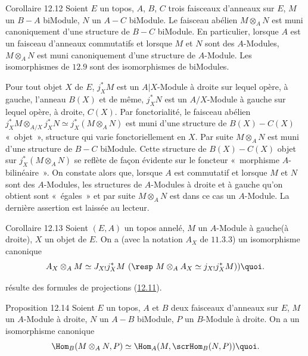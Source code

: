 \begin{enonce*}{Corollaire 12.12}
Soient $E$ un topos, $A$, $B$, $C$ trois faisceaux d'anneaux sur
$E$, $M$ un $B-A$ biModule, $N$ un $A-C$ biModule. Le faisceau
abélien $M\otimes_A N$ est muni canoniquement d'une structure de
$B-C$ biModule. En particulier, lorsque $A$ est un faisceau
d'anneaux commutatifs et lorsque $M$ et $N$ sont des $A$-Modules,
$M\otimes_AN$ est muni canoniquement d'une structure de $A$-Module.
Les isomorphismes de $\hyperref[IV.subsec12.9]{12.9}$ sont des isomorphismes de
biModules.
\end{enonce*}

Pour tout objet $X$ de $E$, $j^{\ast}_XM$ est un $A| X$-Module à
droite sur lequel opère, à gauche, l'anneau $B(X)$ et de même,
$j^{\ast}_XN$ est un $A/X$-Module à gauche sur lequel opère, à
droite, $C(X)$. Par fonctorialité, le faisceau abélien
$j^{\ast}_XM\otimes_{A/X} j^{\ast}_XN\simeq j^{\ast}_X (M\otimes_A
N)$ est muni d'une structure de $B(X)-C(X)$ « objet », structure
qui varie fonctoriellement en $X$. Par suite $M\otimes_A N$ est muni
d'une structure de $B-C$ biModule. Cette structure de $B(X)-C(X)$
objet sur $j^{\ast}_X(M\otimes_A N)$ se reflète de façon évidente
sur le foncteur « morphisme $A$-bilinéaire ». On constate alors
que, lorsque $A$ est commutatif et lorsque $M$ et $N$ sont des
$A$-Modules, les structures de $A$-Modules à droite et à gauche
qu'on obtient sont « égales »  et par suite $M\otimes_A N$ est
dans ce cas un $A$-Module. La dernière assertion est laissée au
lecteur.

\begin{enonce*}{Corollaire 12.13}
Soient $(E,A)$ un topos annelé, $M$ un $A$-Module à
gauche\pageoriginale (\resp à droite), $X$ un objet de $E$. On a
(avec la notation $A_X$ de $\hyperref[IV.prop11.3.3]{11.3.3}$) un isomorphisme
canonique
$$
A_X\otimes_AM\simeq J_{X!} j^{\ast}_XM\text{ (\resp } M\otimes_A
A_X\simeq j_{X!}j^{\ast}_XM)){\quoi}.
$$
\end{enonce*}

\noindent résulte des formules de projections (\hyperref[IV.prop12.11]{12.11}).

\begin{enonce*}{Proposition 12.14}
Soient $E$ un topos, $A$ et $B$ deux faisceaux d'anneaux sur $E$,
$M$ un $A$-Module à droite, $N$ un $A-B$ biModule, $P$ un $B$-Module
à droite. On a un isomorphisme canonique
$$
\Hom_B(M\otimes_A N,P)\simeq \Hom_A (M,\scrHom_B (N,P)){\quoi}.
$$
\end{enonce*}


